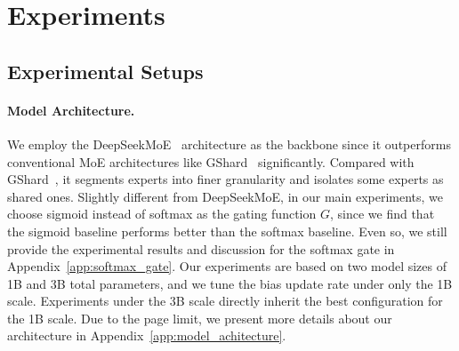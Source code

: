 \documentclass{article} %
\newcommand{\lean}[1]{\textcolor{brown}{\bf \small[#1 - wang]}}{}
\begin{document}


\section{Experiments}

\subsection{Experimental Setups}

\paragraph{Model Architecture.}
\label{par:model_architecture}
We employ the DeepSeekMoE~\citep{Dai2024DeepSeekMoETU} architecture as the backbone since it outperforms conventional MoE architectures like GShard~\citep{Lepikhin2020GShardSG} significantly. 
Compared with GShard~\citep{Lepikhin2020GShardSG}, it segments experts into finer granularity and isolates some experts as shared ones. 
Slightly different from DeepSeekMoE, in our main experiments, we choose sigmoid instead of softmax as the gating function $G$, since we find that the sigmoid baseline performs better than the softmax baseline. 
Even so, we still provide the experimental results and discussion for the softmax gate in Appendix~\ref{app:softmax_gate}.
Our experiments are based on two model sizes of 1B and 3B total parameters, and we tune the bias update rate under only the 1B scale. 
Experiments under the 3B scale directly inherit the best configuration for the 1B scale. 
Due to the page limit, we present more details about our architecture in Appendix~\ref{app:model_achitecture}. 
\end{document}
